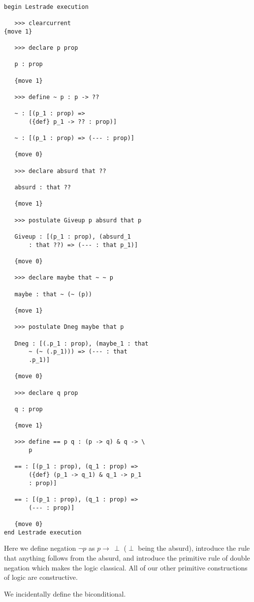 \documentclass[12pt]{article}
\begin{document}
\begin{verbatim}

begin Lestrade execution

   >>> clearcurrent
{move 1}

   >>> declare p prop

   p : prop

   {move 1}

   >>> define ~ p : p -> ??

   ~ : [(p_1 : prop) => 
       ({def} p_1 -> ?? : prop)]

   ~ : [(p_1 : prop) => (--- : prop)]

   {move 0}

   >>> declare absurd that ??

   absurd : that ??

   {move 1}

   >>> postulate Giveup p absurd that p

   Giveup : [(p_1 : prop), (absurd_1 
       : that ??) => (--- : that p_1)]

   {move 0}

   >>> declare maybe that ~ ~ p

   maybe : that ~ (~ (p))

   {move 1}

   >>> postulate Dneg maybe that p

   Dneg : [(.p_1 : prop), (maybe_1 : that 
       ~ (~ (.p_1))) => (--- : that 
       .p_1)]

   {move 0}

   >>> declare q prop

   q : prop

   {move 1}

   >>> define == p q : (p -> q) & q -> \
       p

   == : [(p_1 : prop), (q_1 : prop) => 
       ({def} (p_1 -> q_1) & q_1 -> p_1 
       : prop)]

   == : [(p_1 : prop), (q_1 : prop) => 
       (--- : prop)]

   {move 0}
end Lestrade execution
\end{verbatim}

Here we define negation $\neg p$ as $p \rightarrow \, \perp$ ($\perp$ being the absurd), introduce the rule that anything follows from the absurd, and introduce the primitive rule of  double negation which makes the logic classical.
All of our other primitive constructions of logic are constructive.

We incidentally define the biconditional.
\end{document}
